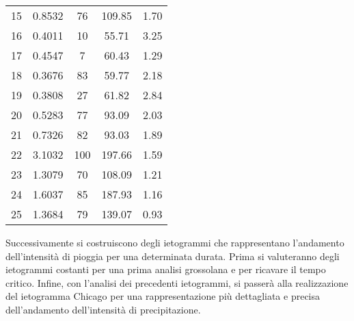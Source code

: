 \begin{table}[htb]
\begin{tabular}{cS[table-format=1.4]S[table-format=3.0]S[table-format=3.2]S[table-format=1.2]}
15       & 0.8532      & 76                & 109.85              & 1.70           \\
16       & 0.4011      & 10                & 55.71               & 3.25           \\
17       & 0.4547      & 7                 & 60.43               & 1.29           \\
18       & 0.3676      & 83                & 59.77               & 2.18           \\
19       & 0.3808      & 27                & 61.82               & 2.84           \\
20       & 0.5283      & 77                & 93.09               & 2.03           \\
21       & 0.7326      & 82                & 93.03               & 1.89           \\
22       & 3.1032      & 100               & 197.66              & 1.59           \\
23       & 1.3079      & 70                & 108.09              & 1.21           \\
24       & 1.6037      & 85                & 187.93              & 1.16           \\
25       & 1.3684      & 79                & 139.07              & 0.93           \\ \bottomrule
\end{tabular}
\end{table}

Successivamente si costruiscono degli ietogrammi che rappresentano l'andamento dell'intensità di pioggia per una determinata durata. 
Prima si valuteranno degli ietogrammi costanti per una prima analisi grossolana e per ricavare il tempo critico.
Infine, con l'analisi dei precedenti ietogrammi, si passerà alla realizzazione del ietogramma Chicago per una rappresentazione più dettagliata e precisa dell'andamento dell'intensità di precipitazione.


